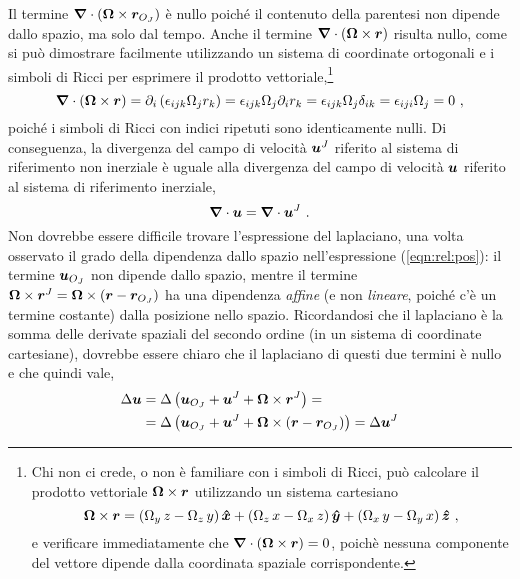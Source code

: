 Il termine $\bm{\nabla} \cdot \left( \bm{\Omega} \times \bm{r}_{O_J} \right)$ è nullo poiché il contenuto della parentesi non dipende dallo spazio, ma solo dal tempo. Anche il termine $\bm{\nabla} \cdot \left( \bm{\Omega} \times \bm{r} \right)$ risulta nullo, come si può dimostrare facilmente utilizzando un sistema di coordinate ortogonali e i simboli di Ricci per esprimere il prodotto vettoriale,\footnote{
 Chi non ci crede, o non è familiare con i simboli di Ricci, può calcolare il prodotto vettoriale $\bm{\Omega} \times \bm{r}$ utilizzando un sistema cartesiano
 \begin{equation}
   \bm{\Omega} \times \pos = 
     \left( \Omega_y \, z - \Omega_z \, y \right) \bm{\hat{x}} +
     \left( \Omega_z \, x - \Omega_x \, z \right) \bm{\hat{y}} +
     \left( \Omega_x \, y - \Omega_y \, x \right) \bm{\hat{z}} \ ,
 \end{equation}
 e verificare immediatamente che $\bm{\nabla} \cdot (\bm{\Omega} \times \bm{r}) = 0$, poichè nessuna componente del vettore dipende dalla coordinata spaziale corrispondente.
}
\begin{equation}
  \bm{\nabla} \cdot \left( \bm{\Omega} \times \bm{r} \right) =
  \partial_i \left( \epsilon_{ijk} \Omega_j r_k \right) =
  \epsilon_{ijk} \Omega_j \partial_i r_k =
  \epsilon_{ijk} \Omega_j \delta_{ik} = 
  \epsilon_{iji} \Omega_j = 0 \ ,
\end{equation}
poiché i simboli di Ricci con indici ripetuti sono identicamente nulli.
Di conseguenza, la divergenza del campo di velocità $\bm{u}^J$ riferito al sistema di riferimento non inerziale è uguale alla divergenza del campo di velocità $\bm{u}$ riferito al sistema di riferimento inerziale,
\begin{equation}
  \bm{\nabla} \cdot \bm{u} = \bm{\nabla} \cdot \bm{u}^J \ .
\end{equation}
%
Non dovrebbe essere difficile trovare l'espressione del laplaciano, una volta osservato il grado della dipendenza dallo spazio nell'espressione (\ref{eqn:rel:pos}): il termine $\bm{u}_{O_J}$ non dipende dallo spazio, mentre il termine $\bm{\Omega} \times \bm{r}^J = \bm{\Omega} \times ( \bm{r} - \bm{r}_{O_J} )$ ha una dipendenza \textit{affine} (e non \textit{lineare}, poiché c'è un termine costante) dalla posizione nello spazio. Ricordandosi che il laplaciano è la somma delle derivate spaziali del secondo ordine (in un sistema di coordinate cartesiane), dovrebbe essere chiaro che il laplaciano di questi due termini è nullo e che quindi vale,
\begin{equation}
\begin{aligned}
 \Delta \bm{u} & = \Delta \left( \bm{u}_{O_J} + \bm{u}^J + \bm{\Omega} \times \bm{r}^J \right) = \\
            & = \Delta \left( \bm{u}_{O_J} + \bm{u}^J + \bm{\Omega} \times ( \bm{r} - \bm{r}_{O_J} ) \right) = \Delta \bm{u}^J
\end{aligned}
\end{equation}

